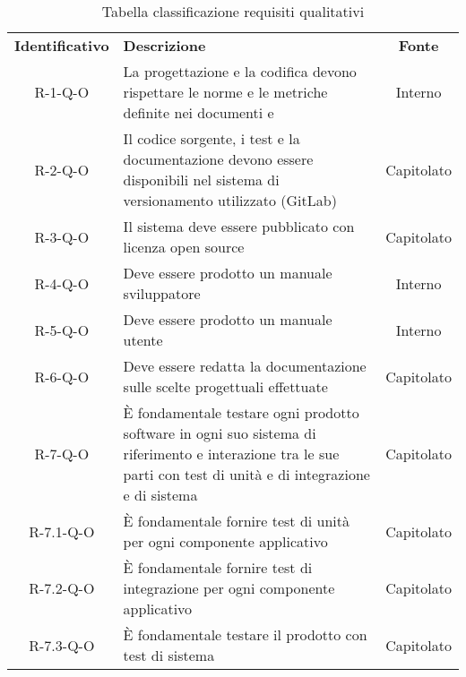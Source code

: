 \renewcommand{\arraystretch}{1.5}
\begin{longtable}{ c C{9cm} c }
    \caption{Tabella classificazione requisiti qualitativi}\\
    \rowcolor{\primaryColor}
    \textcolor{\secondaryColor}{
    \textbf{Identificativo}} & \textcolor{\secondaryColor}{\textbf{Descrizione}}                                                            & \textcolor{\secondaryColor}
    {\textbf{Fonte}}                                                                                                                                                      \\


    R-1-Q-O     & La progettazione e la codifica devono rispettare le norme e le metriche definite nei documenti \NdPv{} e \PdQv{} & Interno\\
    R-2-Q-O     & Il codice sorgente, i test e la documentazione devono essere disponibili nel sistema di versionamento utilizzato (GitLab) & Capitolato\\
    R-3-Q-O     & Il sistema deve essere pubblicato con licenza open source & Capitolato\\
    R-4-Q-O     & Deve essere prodotto un manuale sviluppatore & Interno \\
    R-5-Q-O     & Deve essere prodotto un manuale utente & Interno \\
    R-6-Q-O     & Deve essere redatta la documentazione sulle scelte progettuali effettuate & Capitolato \\
    R-7-Q-O     & \`{E} fondamentale testare ogni prodotto software in ogni suo sistema di riferimento e interazione tra le sue parti con test di unità e di integrazione e di sistema & Capitolato\\
    R-7.1-Q-O   & \`{E} fondamentale fornire test di unità per ogni componente applicativo & Capitolato \\
    R-7.2-Q-O   & \`{E} fondamentale fornire test di integrazione per ogni componente applicativo & Capitolato \\
    R-7.3-Q-O   & \`{E} fondamentale testare il prodotto con test di sistema & Capitolato \\




\end{longtable}
